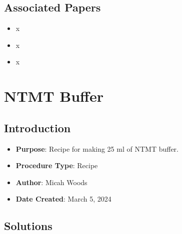 \documentclass[
  letterpaper,
  DIV=11,
  numbers=noendperiod]{scrreprt}
\providecommand{\tightlist}{%
  \setlength{\itemsep}{0pt}\setlength{\parskip}{0pt}}\usepackage{longtable,booktabs,array}
\begin{document}
\hypertarget{associated-papers-75}{%
\section{Associated Papers}\label{associated-papers-75}}

\begin{itemize}
\tightlist
\item
  x
\item
  x
\item
  x
\end{itemize}

\hypertarget{sec-recipe-NTMT}{%
\chapter{NTMT Buffer}\label{sec-recipe-NTMT}}

\hypertarget{introduction-107}{%
\section{Introduction}\label{introduction-107}}

\begin{itemize}
\tightlist
\item
  \textbf{Purpose}: Recipe for making 25 ml of NTMT buffer.
\item
  \textbf{Procedure Type}: Recipe
\item
  \textbf{Author}: Micah Woods
\item
  \textbf{Date Created}: March 5, 2024
\end{itemize}

\hypertarget{solutions-93}{%
\section{Solutions}\label{solutions-93}}
\end{document}
